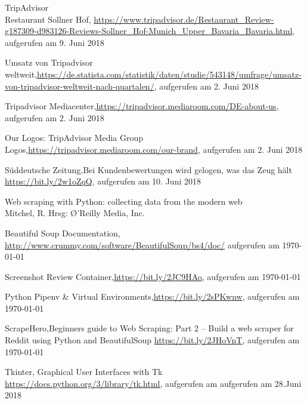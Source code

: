 \documentclass[a4paper,oneside,12pt]{report}
\begin{document}
\begin{thebibliography}{9}
		 TripAdvisor\\ 
		Restaurant Sollner Hof, \url{https://www.tripadvisor.de/Restaurant_Review-g187309-d983126-Reviews-Sollner_Hof-Munich_Upper_Bavaria_Bavaria.html}, aufgerufen am 9. Juni 2018
		
		
		 Umsatz von Tripadvisor weltweit,\newline \url{https://de.statista.com/statistik/daten/studie/543148/umfrage/umsatz-von-tripadvisor-weltweit-nach-quartalen/}, aufgerufen am 2. Juni 2018
		
		 Tripadvisor Mediacenter,\newline \url{https://tripadvisor.mediaroom.com/DE-about-us}, aufgerufen am 2. Juni 2018
		
		 Our Logos: TripAdvisor Media Group Logos,\newline \url{https://tripadvisor.mediaroom.com/our-brand}, aufgerufen am 2. Juni 2018
		
		 Süddeutsche Zeitung,\newline Bei Kundenbewertungen wird gelogen, was das Zeug hält \newline \url{https://bit.ly/2w1oZqQ}, aufgerufen am 10. Juni 2018
		
		 Web scraping with Python: collecting data from the modern web\\ Mitchel, R. Hrsg: \O'Reilly Media, Inc.
		
		 Beautiful Soup Documentation, \newline \url{http://www.crummy.com/software/BeautifulSoup/bs4/doc/} aufgerufen am \today
		
		 Screenshot Review Container,\newline \url{https://bit.ly/2JC9HAo}, aufgerufen am \today
		
		 Python Pipenv \& Virtual Environments,\newline \url{https://bit.ly/2sPKwnw}, aufgerufen am \today
		
		 ScrapeHero,\newline Beginners guide to Web Scraping: Part 2 – Build a web scraper for Reddit using Python and BeautifulSoup \newline \url{https://bit.ly/2JHoVnT}, aufgerufen am \today
		
		 Tkinter, \newline
		Graphical User Interfaces with Tk\\
		\url{https://docs.python.org/3/library/tk.html}, aufgerufen am aufgerufen am 28.Juni 2018
		
	\end{thebibliography}
	
\end{document}
